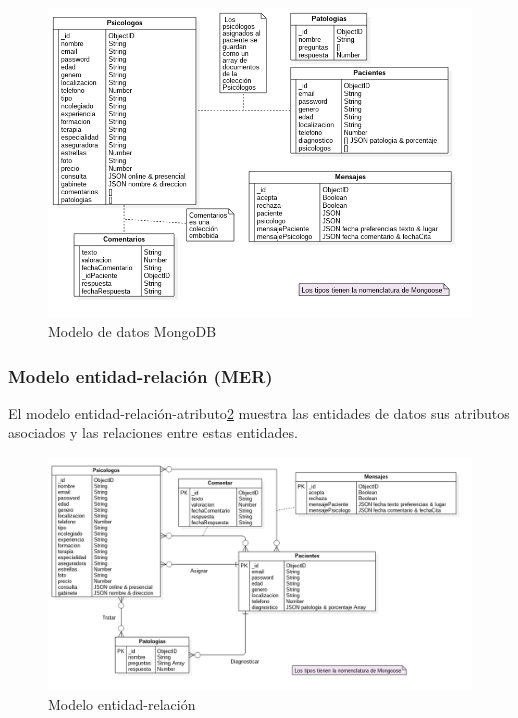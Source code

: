 \begin{figure}[htbp] 
    \centering
    \includegraphics[width=1\textwidth]{figuras/bbdd_mod_mongoDB.png}
    \caption{Modelo de datos MongoDB}
    \label{fig:mod_datos_mongoDB}
\end{figure}	

\subsubsection{Modelo entidad-relación (MER)}
El modelo entidad-relación-atributo\ref{fig:mod_datos_mer} muestra las entidades de datos sus atributos asociados y las relaciones entre estas entidades. 


\begin{figure}[htbp] 
    \centering
    \includegraphics[width=1\textwidth]{figuras/bbdd_mod_MER.png}
    \caption{Modelo entidad-relación}
    \label{fig:mod_datos_mer}
\end{figure}

